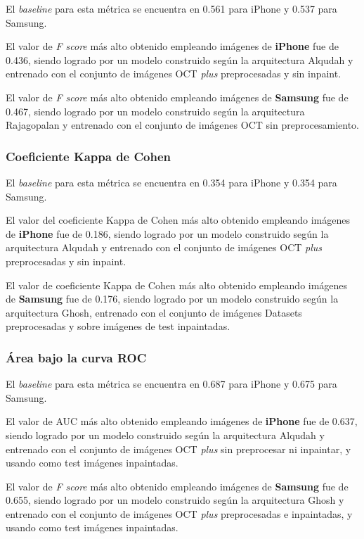 El \textit{baseline} para esta métrica se encuentra en 0.561 para iPhone y 0.537 para Samsung.

El valor de \textit{F score} más alto obtenido empleando imágenes de \textbf{iPhone} fue de 0.436, siendo logrado por un modelo construido según la arquitectura Alqudah y entrenado con el conjunto de imágenes OCT \textit{plus} preprocesadas y sin inpaint.

El valor de \textit{F score} más alto obtenido empleando imágenes de \textbf{Samsung} fue de 0.467, siendo logrado por un modelo construido según la arquitectura Rajagopalan y entrenado con el conjunto de imágenes OCT sin preprocesamiento.

\subsubsection{Coeficiente Kappa de Cohen}

El \textit{baseline} para esta métrica se encuentra en 0.354 para iPhone y 0.354 para Samsung.

El valor del coeficiente Kappa de Cohen más alto obtenido empleando imágenes de \textbf{iPhone} fue de 0.186, siendo logrado por un modelo construido según la arquitectura Alqudah y entrenado con el conjunto de imágenes OCT \textit{plus} preprocesadas y sin inpaint.

El valor de coeficiente Kappa de Cohen más alto obtenido empleando imágenes de \textbf{Samsung} fue de 0.176, siendo logrado por un modelo construido según la arquitectura Ghosh, entrenado con el conjunto de imágenes Datasets preprocesadas y sobre imágenes de test inpaintadas.

\subsubsection{Área bajo la curva ROC}

El \textit{baseline} para esta métrica se encuentra en 0.687 para iPhone y 0.675 para Samsung.

El valor de AUC más alto obtenido empleando imágenes de \textbf{iPhone} fue de 0.637, siendo logrado por un modelo construido según la arquitectura Alqudah y entrenado con el conjunto de imágenes OCT \textit{plus} sin preprocesar ni inpaintar, y usando como test imágenes inpaintadas.

El valor de \textit{F score} más alto obtenido empleando imágenes de \textbf{Samsung} fue de 0.655, siendo logrado por un modelo construido según la arquitectura Ghosh y entrenado con el conjunto de imágenes OCT \textit{plus} preprocesadas e inpaintadas, y usando como test imágenes inpaintadas.

